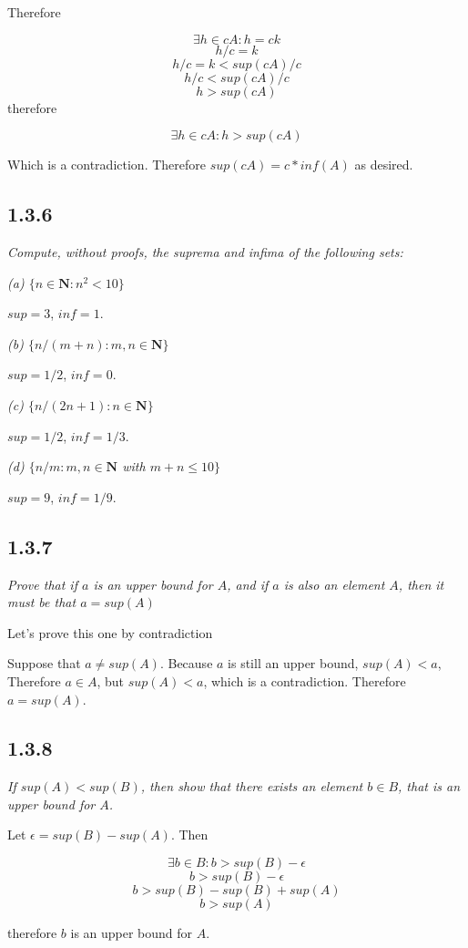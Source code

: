 \documentclass[11pt,oneside,titlepage]{book}
\begin{document}
Therefore

$$\exists h \in cA: h = ck$$
$$h/c = k$$
$$h/c = k < sup(cA) / c$$
$$h/c < sup(cA) / c$$
$$h > sup(cA)$$
therefore

$$\exists h \in cA: h > sup(cA)$$

Which is a contradiction. Therefore $sup(cA) = c * inf(A)$ as desired.

\subsection*{1.3.6}
\textit{Compute, without proofs, the suprema and infima of the following
  sets:}

\textit{(a) $\{n \in \textbf{N}: n^2 < 10\}$}

$sup = 3$, $inf = 1$.

\textit{(b) $\{n/(m + n): m,n\in \textbf{N}\}$}

$sup = 1/2$, $inf = 0$.

\textit{(c) $\{n/(2n + 1): n\in \textbf{N}\}$}

$sup = 1/2$, $inf = 1/3$.

\textit{(d) $\{n/m: m,n\in \textbf{N}$ with $m + n \leq 10\}$}

$sup = 9$, $inf = 1/9$.

\subsection*{1.3.7}
\textit{Prove that if $a$ is an upper bound for $A$, and if $a$ is also an
  element $A$, then it must be that $a = sup(A)$}

Let's prove this one by contradiction

Suppose that $a \neq sup(A)$. Because $a$ is still an upper bound, $sup(A) <
a$, Therefore $a \in A$, but $sup(A) < a$, which is a contradiction.
Therefore $a = sup(A)$.

\subsection*{1.3.8}
\textit{If $sup(A) < sup(B)$, then show that there exists an element $b \in B$,
  that is an upper bound for $A$.}

Let $\epsilon = sup(B) - sup(A)$. Then

$$\exists b \in B: b > sup(B) - \epsilon$$
$$ b > sup(B) - \epsilon $$
$$ b > sup(B) - sup(B) + sup(A) $$
$$ b > sup(A) $$

therefore $b$ is an upper bound for $A$.
\end{document}
